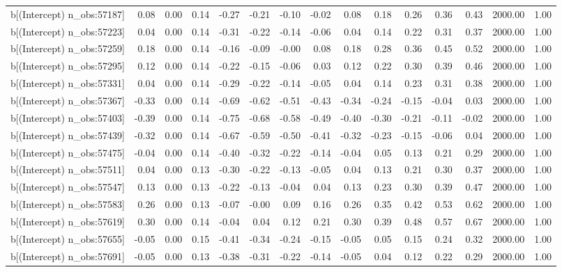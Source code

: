 \begin{table}[ht]
\begin{tabular}{rrrrrrrrrrrrrrr}
  b[(Intercept) n\_obs:57187] & 0.08 & 0.00 & 0.14 & -0.27 & -0.21 & -0.10 & -0.02 & 0.08 & 0.18 & 0.26 & 0.36 & 0.43 & 2000.00 & 1.00 \\ 
  b[(Intercept) n\_obs:57223] & 0.04 & 0.00 & 0.14 & -0.31 & -0.22 & -0.14 & -0.06 & 0.04 & 0.14 & 0.22 & 0.31 & 0.37 & 2000.00 & 1.00 \\ 
  b[(Intercept) n\_obs:57259] & 0.18 & 0.00 & 0.14 & -0.16 & -0.09 & -0.00 & 0.08 & 0.18 & 0.28 & 0.36 & 0.45 & 0.52 & 2000.00 & 1.00 \\ 
  b[(Intercept) n\_obs:57295] & 0.12 & 0.00 & 0.14 & -0.22 & -0.15 & -0.06 & 0.03 & 0.12 & 0.22 & 0.30 & 0.39 & 0.46 & 2000.00 & 1.00 \\ 
  b[(Intercept) n\_obs:57331] & 0.04 & 0.00 & 0.14 & -0.29 & -0.22 & -0.14 & -0.05 & 0.04 & 0.14 & 0.23 & 0.31 & 0.38 & 2000.00 & 1.00 \\ 
  b[(Intercept) n\_obs:57367] & -0.33 & 0.00 & 0.14 & -0.69 & -0.62 & -0.51 & -0.43 & -0.34 & -0.24 & -0.15 & -0.04 & 0.03 & 2000.00 & 1.00 \\ 
  b[(Intercept) n\_obs:57403] & -0.39 & 0.00 & 0.14 & -0.75 & -0.68 & -0.58 & -0.49 & -0.40 & -0.30 & -0.21 & -0.11 & -0.02 & 2000.00 & 1.00 \\ 
  b[(Intercept) n\_obs:57439] & -0.32 & 0.00 & 0.14 & -0.67 & -0.59 & -0.50 & -0.41 & -0.32 & -0.23 & -0.15 & -0.06 & 0.04 & 2000.00 & 1.00 \\ 
  b[(Intercept) n\_obs:57475] & -0.04 & 0.00 & 0.14 & -0.40 & -0.32 & -0.22 & -0.14 & -0.04 & 0.05 & 0.13 & 0.21 & 0.29 & 2000.00 & 1.00 \\ 
  b[(Intercept) n\_obs:57511] & 0.04 & 0.00 & 0.13 & -0.30 & -0.22 & -0.13 & -0.05 & 0.04 & 0.13 & 0.21 & 0.30 & 0.37 & 2000.00 & 1.00 \\ 
  b[(Intercept) n\_obs:57547] & 0.13 & 0.00 & 0.13 & -0.22 & -0.13 & -0.04 & 0.04 & 0.13 & 0.23 & 0.30 & 0.39 & 0.47 & 2000.00 & 1.00 \\ 
  b[(Intercept) n\_obs:57583] & 0.26 & 0.00 & 0.13 & -0.07 & -0.00 & 0.09 & 0.16 & 0.26 & 0.35 & 0.42 & 0.53 & 0.62 & 2000.00 & 1.00 \\ 
  b[(Intercept) n\_obs:57619] & 0.30 & 0.00 & 0.14 & -0.04 & 0.04 & 0.12 & 0.21 & 0.30 & 0.39 & 0.48 & 0.57 & 0.67 & 2000.00 & 1.00 \\ 
  b[(Intercept) n\_obs:57655] & -0.05 & 0.00 & 0.15 & -0.41 & -0.34 & -0.24 & -0.15 & -0.05 & 0.05 & 0.15 & 0.24 & 0.32 & 2000.00 & 1.00 \\ 
  b[(Intercept) n\_obs:57691] & -0.05 & 0.00 & 0.13 & -0.38 & -0.31 & -0.22 & -0.14 & -0.05 & 0.04 & 0.12 & 0.22 & 0.29 & 2000.00 & 1.00 \\ 

\end{tabular}
\end{table}
